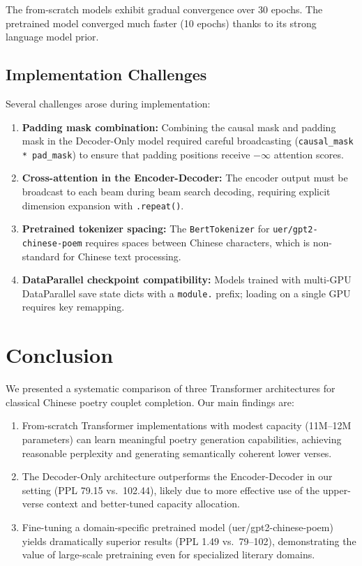 \documentclass[11pt,a4paper]{article}
\begin{document}
The from-scratch models exhibit gradual convergence over 30 epochs.
The pretrained model converged much faster (10 epochs) thanks to its strong
language model prior.

\subsection{Implementation Challenges}

Several challenges arose during implementation:

\begin{enumerate}[nosep]
    \item \textbf{Padding mask combination:}
          Combining the causal mask and padding mask in the Decoder-Only model
          required careful broadcasting (\texttt{causal\_mask * pad\_mask})
          to ensure that padding positions receive \(-\infty\) attention
          scores.
    \item \textbf{Cross-attention in the Encoder-Decoder:}
          The encoder output must be broadcast to each beam during beam search
          decoding, requiring explicit dimension expansion with
          \texttt{.repeat()}.
    \item \textbf{Pretrained tokenizer spacing:}
          The \texttt{BertTokenizer} for \texttt{uer/gpt2-chinese-poem}
          requires spaces between Chinese characters, which is non-standard
          for Chinese text processing.
    \item \textbf{DataParallel checkpoint compatibility:}
          Models trained with multi-GPU DataParallel save state dicts with a
          \texttt{module.} prefix; loading on a single GPU requires key
          remapping.
\end{enumerate}

\section{Conclusion}
\label{sec:conclusion}

We presented a systematic comparison of three Transformer architectures for
classical Chinese poetry couplet completion.
Our main findings are:

\begin{enumerate}[nosep]
    \item From-scratch Transformer implementations with modest capacity
          (11M--12M parameters) can learn meaningful poetry generation
          capabilities, achieving reasonable perplexity and generating
          semantically coherent lower verses.
    \item The Decoder-Only architecture outperforms the Encoder-Decoder in
          our setting (PPL 79.15 vs.~102.44), likely due to more effective
          use of the upper-verse context and better-tuned capacity allocation.
    \item Fine-tuning a domain-specific pretrained model
          (uer/gpt2-chinese-poem) yields dramatically superior results
          (PPL 1.49 vs.~79--102), demonstrating the value of large-scale
          pretraining even for specialized literary domains.
\end{enumerate}
\end{document}
